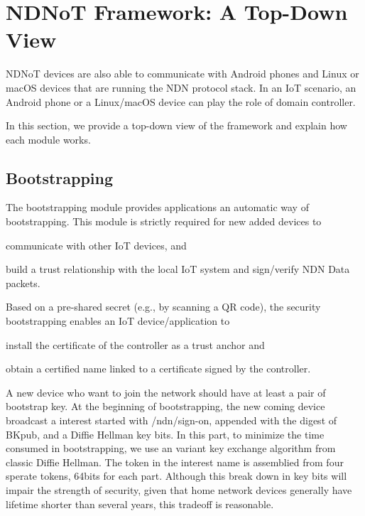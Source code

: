 \documentclass[sigconf]{acmart}
\begin{document}
\section{NDNoT Framework: A Top-Down View}

NDNoT devices are also able to communicate with Android phones and Linux or macOS devices that are running the NDN protocol stack.
In an IoT scenario, an Android phone or a Linux/macOS device can play the role of domain controller.

In this section, we provide a top-down view of the framework and explain how each module works.

\subsection{Bootstrapping}

The bootstrapping module provides applications an automatic way of bootstrapping. This module is strictly required for new added devices to
\begin{enumerate*} [label=(\roman*)]
	\item communicate with other IoT devices,
	and
	\item build a trust relationship with the local IoT system and sign/verify NDN Data packets.
\end{enumerate*}

Based on a pre-shared secret (e.g., by scanning a QR code), the security bootstrapping enables an IoT device/application to
\begin{enumerate*} [label=(\roman*)]
	\item install the certificate of the controller as a trust anchor
	and
	\item obtain a certified name linked to a certificate signed by the controller.
\end{enumerate*}

A new device who want to join the network should have at least a pair of bootstrap key. At the beginning of bootstrapping, the 
new coming device broadcast a interest started with /ndn/sign-on, appended with the digest of BKpub, and a Diffie Hellman key bits.
In this part, to minimize the time consumed in bootstrapping, we use an variant key exchange algorithm from classic Diffie Hellman. 
The token in the interest name is assemblied from four sperate tokens, 64bits for each part. Although this break down in key bits 
will impair the strength of security, given that home network devices generally have lifetime shorter than several years, this tradeoff is reasonable. 
\end{document}
